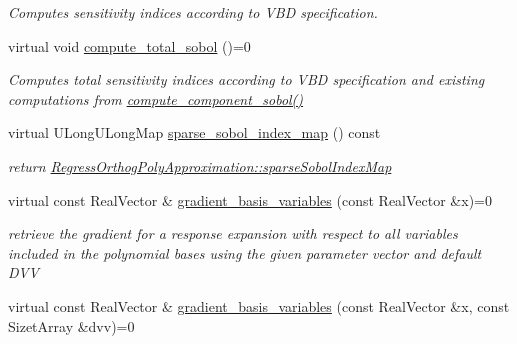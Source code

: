 \begin{DoxyCompactItemize}
\begin{DoxyCompactList}\small\item\em Computes sensitivity indices according to V\+BD specification. \end{DoxyCompactList}\item 
virtual void \hyperlink{classPecos_1_1PolynomialApproximation_af826aa330c2b83a225dce2407bac6e39}{compute\+\_\+total\+\_\+sobol} ()=0\label{classPecos_1_1PolynomialApproximation_af826aa330c2b83a225dce2407bac6e39}

\begin{DoxyCompactList}\small\item\em Computes total sensitivity indices according to V\+BD specification and existing computations from \hyperlink{classPecos_1_1PolynomialApproximation_ae369b467e0829f05cfcd1b68d90fb741}{compute\+\_\+component\+\_\+sobol()} \end{DoxyCompactList}\item 
virtual U\+Long\+U\+Long\+Map \hyperlink{classPecos_1_1PolynomialApproximation_a0edcfdc2d2b3f4e37d3a3f7d591cf9e0}{sparse\+\_\+sobol\+\_\+index\+\_\+map} () const \label{classPecos_1_1PolynomialApproximation_a0edcfdc2d2b3f4e37d3a3f7d591cf9e0}

\begin{DoxyCompactList}\small\item\em return \hyperlink{classPecos_1_1RegressOrthogPolyApproximation_ac024e059bf921ce1d6aaf0506066b8a3}{Regress\+Orthog\+Poly\+Approximation\+::sparse\+Sobol\+Index\+Map} \end{DoxyCompactList}\item 
virtual const Real\+Vector \& \hyperlink{classPecos_1_1PolynomialApproximation_aed55fee7da787c78db161950b3d8868f}{gradient\+\_\+basis\+\_\+variables} (const Real\+Vector \&x)=0\label{classPecos_1_1PolynomialApproximation_aed55fee7da787c78db161950b3d8868f}

\begin{DoxyCompactList}\small\item\em retrieve the gradient for a response expansion with respect to all variables included in the polynomial bases using the given parameter vector and default D\+VV \end{DoxyCompactList}\item 
virtual const Real\+Vector \& \hyperlink{classPecos_1_1PolynomialApproximation_acbdc4eeec56540a31e44ca2df5414ffd}{gradient\+\_\+basis\+\_\+variables} (const Real\+Vector \&x, const Sizet\+Array \&dvv)=0\label{classPecos_1_1PolynomialApproximation_acbdc4eeec56540a31e44ca2df5414ffd}


\end{DoxyCompactItemize}
